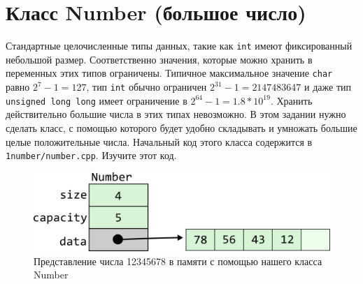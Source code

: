 \documentclass{article}
\begin{document}
\newpage
\section*{Класс Number (большое число)}
Стандартные целочисленные  типы данных, такие как \texttt{int} имеют фиксированный небольшой размер. Соответственно значения, которые можно хранить в переменных этих типов ограничены. Типичное максимальное значение \texttt{char} равно $2^7 - 1 = 127$, тип \texttt{int} обычно ограничен $2^{31}-1 = 2147483647$ и даже тип \texttt{unsigned long long} имеет ограничение в $2^{64}-1 = 1.8 * 10^{19}$. Хранить действительно большие числа в этих типах невозможно. В этом задании нужно сделать класс, с помощью которого будет удобно складывать и умножать большие целые положительные числа. Начальный код этого класса содержится в \texttt{1number/number.cpp}. Изучите этот код.


\begin{figure}[h!]
  \centering
  \includegraphics[scale=1]{../images/number1.png}
  \caption{Представление числа 12345678 в памяти с помощью нашего класса Number}
  \label{fig:nummber1}
\end{figure}
\end{document}
